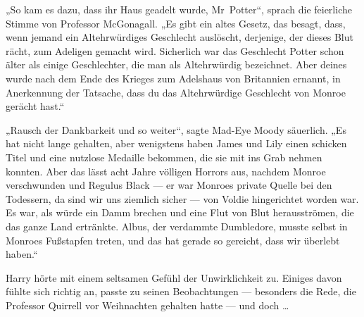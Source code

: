 „So kam es dazu, dass ihr Haus geadelt wurde, Mr~Potter“, sprach die feierliche Stimme von Professor McGonagall.
„Es gibt ein altes Gesetz, das besagt, dass, wenn jemand ein Altehrwürdiges Geschlecht auslöscht, derjenige, der dieses Blut rächt, zum Adeligen gemacht wird. Sicherlich war das Geschlecht Potter schon älter als einige Geschlechter, die man als Altehrwürdig bezeichnet. Aber deines wurde nach dem Ende des Krieges zum Adelshaus von Britannien ernannt, in Anerkennung der Tatsache, dass du das Altehrwürdige Geschlecht von Monroe gerächt hast.“

„Rausch der Dankbarkeit und so weiter“, sagte Mad-Eye Moody säuerlich.
„Es hat nicht lange gehalten, aber wenigstens haben James und Lily einen schicken Titel und eine nutzlose Medaille bekommen, die sie mit ins Grab nehmen konnten. Aber das lässt acht Jahre völligen Horrors aus, nachdem Monroe verschwunden und Regulus Black — er war Monroes private Quelle bei den Todessern, da sind wir uns ziemlich sicher — von Voldie hingerichtet worden war. Es war, als würde ein Damm brechen und eine Flut von Blut herausströmen, die das ganze Land ertränkte. Albus, der verdammte Dumbledore, musste selbst in Monroes Fußstapfen treten, und das hat gerade so gereicht, dass wir überlebt haben.“

Harry hörte mit einem seltsamen Gefühl der Unwirklichkeit zu. Einiges davon fühlte sich richtig an, passte zu seinen Beobachtungen — besonders die Rede, die Professor Quirrell vor Weihnachten gehalten hatte — und doch …

